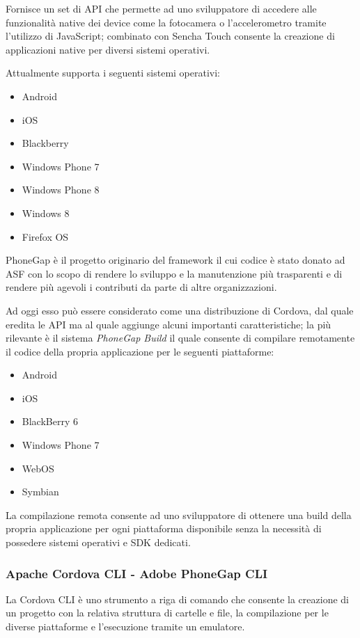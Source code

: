 Fornisce un set di \ac{API} che permette ad uno sviluppatore di accedere alle funzionalità native dei device come la fotocamera o l'accelerometro tramite l'utilizzo di JavaScript; combinato con Sencha Touch consente la creazione di applicazioni native per diversi sistemi operativi.

Attualmente supporta i seguenti sistemi operativi:
\begin{itemize}
\item Android
\item iOS
\item Blackberry
\item Windows Phone 7
\item Windows Phone 8
\item Windows 8
\item Firefox OS
\end{itemize}

PhoneGap è il progetto originario del framework il cui codice è stato donato ad \ac{ASF} con lo scopo di rendere lo sviluppo e la manutenzione più trasparenti e di rendere più agevoli i contributi da parte di altre organizzazioni.

Ad oggi esso può essere considerato come una distribuzione di Cordova, dal quale eredita le \ac{API} ma al quale aggiunge alcuni importanti caratteristiche; la più rilevante è il sistema \emph{PhoneGap Build} il quale consente di compilare remotamente il codice della propria applicazione per le seguenti piattaforme:
\begin{itemize}
\item Android
\item iOS
\item BlackBerry 6
\item Windows Phone 7
\item WebOS
\item Symbian
\end{itemize}

La compilazione remota consente ad uno sviluppatore di ottenere una build della propria applicazione per ogni piattaforma disponibile senza la necessità di possedere sistemi operativi e \ac{SDK} dedicati.

\subsubsection{Apache Cordova CLI - Adobe PhoneGap CLI}
La Cordova \ac{CLI} è uno strumento a riga di comando che consente la creazione di un progetto con la relativa struttura di cartelle e file, la compilazione per le diverse piattaforme e l'esecuzione tramite un emulatore.

